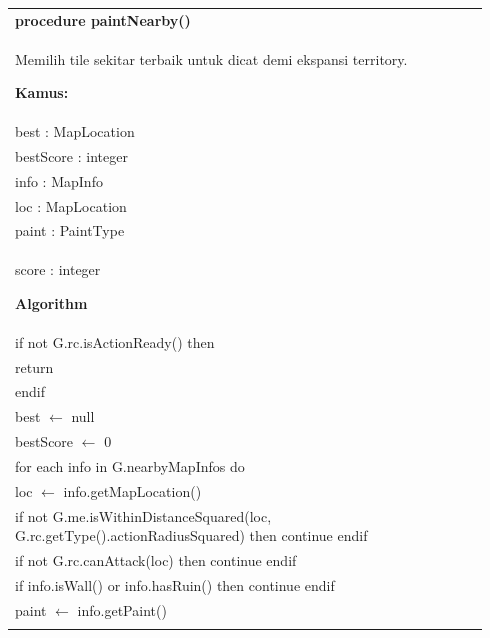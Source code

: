\documentclass{article}
\newenvironment{pseudobox}
{
\centering
\begin{longtable}{|p{0.94\linewidth}|}
\hline
}
{
\\ \hline
\end{longtable}
\vspace{0.05cm}
}
\begin{document}
\begin{pseudobox}
\textbf{procedure paintNearby()} \\
{ Memilih tile sekitar terbaik untuk dicat demi ekspansi territory. }

\textbf{Kamus:} \\
\hspace*{1em} best : MapLocation \\
\hspace*{1em} bestScore : integer \\
\hspace*{1em} info : MapInfo \\
\hspace*{1em} loc : MapLocation \\
\hspace*{1em} paint : PaintType \\
\hspace*{1em} score : integer

\textbf{Algorithm} \\
\hspace*{1em} if not G.rc.isActionReady() then \\
\hspace*{2em} return \\
\hspace*{1em} endif \\

\hspace*{1em} best $\leftarrow$ null \\
\hspace*{1em} bestScore $\leftarrow$ 0 \\

\hspace*{1em} for each info in G.nearbyMapInfos do \\
\hspace*{2em} loc $\leftarrow$ info.getMapLocation() \\
\hspace*{2em} if not G.me.isWithinDistanceSquared(loc, G.rc.getType().actionRadiusSquared) then continue endif \\
\hspace*{2em} if not G.rc.canAttack(loc) then continue endif \\
\hspace*{2em} if info.isWall() or info.hasRuin() then continue endif \\

\hspace*{2em} paint $\leftarrow$ info.getPaint() \\


\end{pseudobox}
\end{document}
